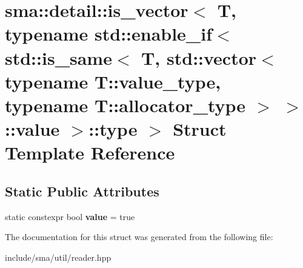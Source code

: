 \hypertarget{structsma_1_1detail_1_1is__vector_3_01T_00_01typename_01std_1_1enable__if_3_01std_1_1is__same_3_9d34c27f05b3399b2e14e513707d89ed}{\section{sma\-:\-:detail\-:\-:is\-\_\-vector$<$ T, typename std\-:\-:enable\-\_\-if$<$ std\-:\-:is\-\_\-same$<$ T, std\-:\-:vector$<$ typename T\-:\-:value\-\_\-type, typename T\-:\-:allocator\-\_\-type $>$ $>$\-:\-:value $>$\-:\-:type $>$ Struct Template Reference}
\label{structsma_1_1detail_1_1is__vector_3_01T_00_01typename_01std_1_1enable__if_3_01std_1_1is__same_3_9d34c27f05b3399b2e14e513707d89ed}
}
\subsection*{Static Public Attributes}
\begin{DoxyCompactItemize}
\item 
\hypertarget{structsma_1_1detail_1_1is__vector_3_01T_00_01typename_01std_1_1enable__if_3_01std_1_1is__same_3_9d34c27f05b3399b2e14e513707d89ed_ac3520b82ef46f64a090e20df5ac37649}{static constexpr bool {\bfseries value} = true}\label{structsma_1_1detail_1_1is__vector_3_01T_00_01typename_01std_1_1enable__if_3_01std_1_1is__same_3_9d34c27f05b3399b2e14e513707d89ed_ac3520b82ef46f64a090e20df5ac37649}

\end{DoxyCompactItemize}


The documentation for this struct was generated from the following file\-:\begin{DoxyCompactItemize}
\item 
include/sma/util/reader.\-hpp\end{DoxyCompactItemize}
